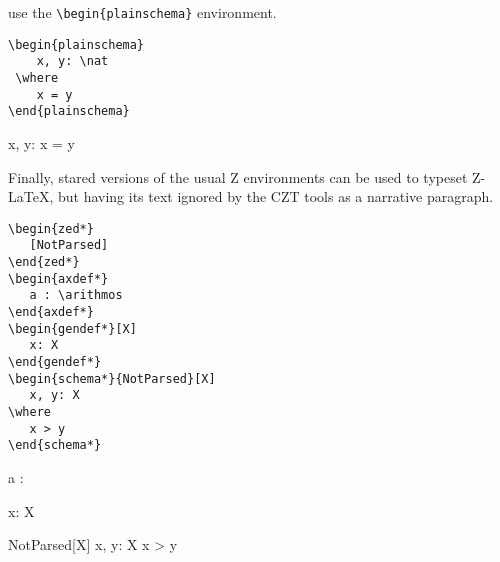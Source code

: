 \documentclass{article}
\def\gives{\endquote\endgroup\egroup}
\begin{document}
use the \verb|\begin{plainschema}| environment.
%
\begin{demo}
\begin{verbatim}
\begin{plainschema}
    x, y: \nat
 \where
    x = y
\end{plainschema}
\end{verbatim}
\gives
\begin{plainschema}
    x, y: \nat
 \where
    x = y
\end{plainschema}
\end{demo}
%
Finally, stared versions of the usual Z environments can be used to
typeset Z-\LaTeX, but having its text ignored by the CZT tools as a narrative paragraph.
%
\begin{demo}
\begin{verbatim}
\begin{zed*}
   [NotParsed]
\end{zed*}
\begin{axdef*}
   a : \arithmos
\end{axdef*}
\begin{gendef*}[X]
   x: X
\end{gendef*}
\begin{schema*}{NotParsed}[X]
   x, y: X
\where
   x > y
\end{schema*}
\end{verbatim}
\gives
\begin{zed*}
   [NotParsed]
\end{zed*}
\begin{axdef*}
   a : \arithmos
\end{axdef*}
\begin{gendef*}[X]
   x: X
\end{gendef*}
\begin{schema*}{NotParsed}[X]
   x, y: X
\where
   x > y
\end{schema*}
\end{demo}

\newpage
\end{document}

